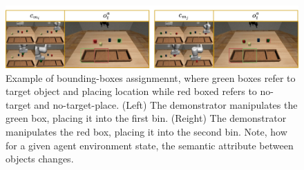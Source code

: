 \begin{figure}[t]
    \centering
    \includegraphics[width=1.0\textwidth]{figures/images/ch2/example_of_bb.jpg}
    \caption{Example of bounding-boxes assignmennt, where green boxes refer to target object and placing location while red boxed refers to no-target and no-target-place. (Left) The demonstrator manipulates the green box, placing it into the first bin. (Reight) The demonstrator manipulates the red box, placing it into the second bin. Note, how for a given agent environment state, the semantic attribute between objects changes.}
    \label{fig:example_of_bb}
\end{figure}

